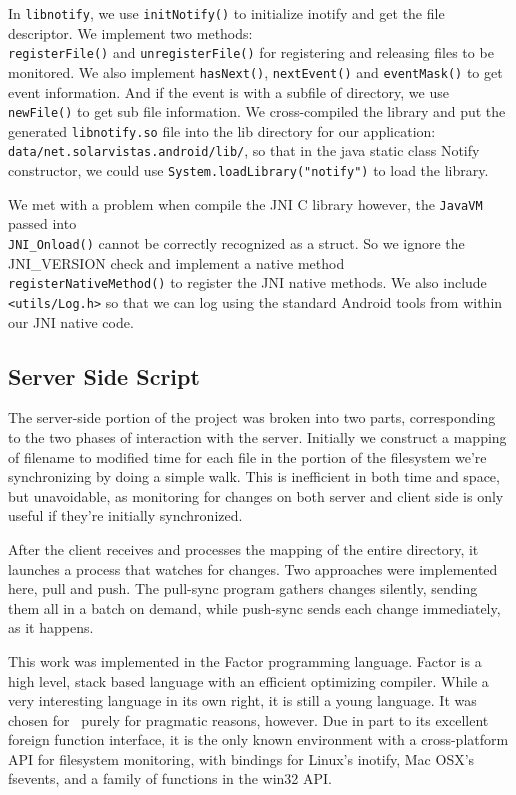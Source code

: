 In \verb+libnotify+, we use \verb+initNotify()+ to initialize inotify and get the file descriptor. We implement two 
methods:\\ \verb+registerFile()+ and \verb+unregisterFile()+ for registering and releasing files to be monitored. 
We also implement \verb+hasNext()+, \verb+nextEvent()+ and \verb+eventMask()+ to get event information. And if the 
event is with a subfile of directory, we use \verb+newFile()+ to get sub file information. We cross-compiled the 
library and put the generated \verb+libnotify.so+ file into the lib directory for our application: \\
\verb+data/net.solarvistas.android/lib/+, so that in the java static class Notify constructor, we could use 
\verb+System.loadLibrary("notify")+ to load the library. 

We met with a problem when compile the JNI C library however, the \verb+JavaVM+ passed into \\ \verb+JNI_Onload()+ 
cannot be correctly recognized as a struct. So we ignore the JNI\_VERSION check and implement a native method \\
\verb+registerNativeMethod()+ to register 
the JNI native methods. We also include\\ \verb+<utils/Log.h>+ so that we can log using the standard Android tools 
from within our JNI native code.

\subsection{Server Side Script}
The server-side portion of the project was broken into two parts, corresponding to the two phases of interaction with the server. Initially we construct a mapping of filename to modified time for each file in the portion of the filesystem we're synchronizing by doing a simple walk. This is inefficient in both time and space, but unavoidable, as monitoring for changes on both server and client side is only useful if they're initially synchronized.

After the client receives and processes the mapping of the entire directory, it launches a process that watches for changes. Two approaches were implemented here, pull and push. The pull-sync program gathers changes silently, sending them all in a batch on demand, while push-sync sends each change immediately, as it happens.

This work was implemented in the Factor programming language.  Factor is a high level, stack based language with an efficient optimizing compiler.  While a very interesting language in its own right, it is still a young language.  It was chosen for \teledroid\ purely for pragmatic reasons, however.  Due in part to its excellent foreign function interface, it is the only known environment with a cross-platform API for filesystem monitoring, with bindings for Linux's inotify, Mac OSX's fsevents, and a family of functions in the win32 API.

